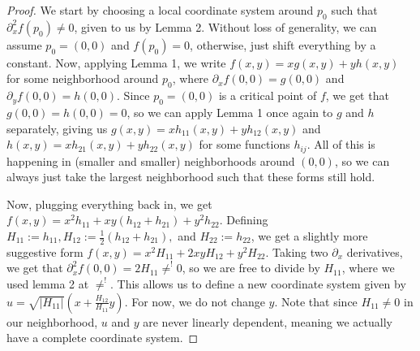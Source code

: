 \documentclass[12pt]{article}
\theoremstyle{definition}
\begin{document}
\begin{proof}
	We start by choosing a local coordinate system around $p_0$ such that $\partial_x^2f(p_0) \neq 0$, given to us by Lemma 2. Without loss of generality, we can assume $p_0 = (0,0)$ and $f(p_0)=0$, otherwise, just shift everything by a constant. Now, applying Lemma 1, we write $f(x,y) = xg(x,y) + yh(x,y)$ for some neighborhood around $p_0$, where $\partial_xf(0,0) = g(0,0)$ and $\partial_y f(0,0) = h(0,0)$. Since $p_0 = (0,0)$ is a critical point of $f$, we get that $g(0,0) = h(0,0) = 0$, so we can apply Lemma 1 once again to $g$ and $h$ separately, giving us $g(x,y) =x h_{11}(x,y) + yh_{12}(x,y)$ and $h(x,y) = xh_{21}(x,y)+yh_{22}(x,y)$ for some functions $h_{ij}$. All of this is happening in (smaller and smaller) neighborhoods around $(0,0)$, so we can always just take the largest neighborhood such that these forms still hold.
	
	Now, plugging everything back in, we get $f(x,y) = x^2h_{11} + xy(h_{12}+h_{21})+ y^2h_{22}$. Defining $H_{11}:= h_{11}, H_{12} := \frac{1}{2}(h_{12}+h_{21}),$ and $H_{22}:= h_22$, we get a slightly more suggestive form $f(x,y) = x^2 H_{11}+ 2xyH_{12}+ y^2H_{22}$. Taking two $\partial_x$ derivatives, we get that $\partial_x^2 f(0,0)= 2H_{11} \neq^! 0$, so we are free to divide by $H_{11}$, where we used lemma 2 at $\neq^!$. This allows us to define a new coordinate system given by $u = \sqrt{|H_{11}|}\left(x + \frac{H_{12}}{H_{11}}y\right)$. For now, we do not change $y$. Note that since $H_{11} \neq 0$ in our neighborhood, $u$ and $y$ are never linearly dependent, meaning we actually have a complete coordinate system. 


\end{proof}
\end{document}

